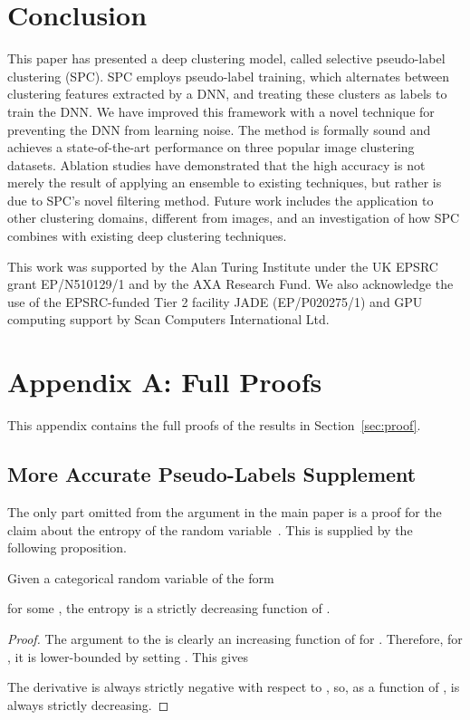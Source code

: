 \documentclass[runningheads]{llncs}
\begin{document}
 \section{Conclusion} \label{sec:conclusion}
This paper has presented a deep clustering model, called selective pseudo-label clustering (SPC). SPC employs pseudo-label training, which alternates between clustering features extracted by a DNN, and treating these clusters as labels to train the DNN. We have improved this framework  with a novel technique for preventing the DNN from learning noise. The method is formally sound and achieves a state-of-the-art performance on three popular image clustering datasets. Ablation studies have demonstrated that the high accuracy is not merely the result of applying an ensemble to existing techniques, but rather is due to SPC's novel filtering method. Future work includes the application to other clustering domains, different from images, and an investigation of how SPC combines with existing deep clustering techniques. 

\medskip 
{}This work was supported by the Alan Turing Institute
under the UK EPSRC grant EP/N510129/1 and by the AXA
Research Fund.  We also acknowledge the use of
the EPSRC-funded Tier 2 facility JADE (EP/P020275/1) and
GPU computing support by Scan Computers International Ltd. 



\newpage
\section{Appendix A: Full Proofs}
This appendix contains the full proofs of the results in Section~\ref{sec:proof}. 


\subsection{More Accurate Pseudo-Labels Supplement}
The only part omitted from the argument in the main paper is a proof for the claim about the entropy of the random variable~. This is supplied by the following proposition.
\begin{proposition}
Given a categorical random variable  of the form 

for some , the entropy  is a strictly decreasing function of . 
\end{proposition}
\begin{proof}

The argument to the  is clearly an increasing function of  for . Therefore, for , it is lower-bounded by setting . This gives

The derivative is always strictly negative with respect to , so, as a function of ,  is always strictly decreasing.
\end{proof}
\end{document}
